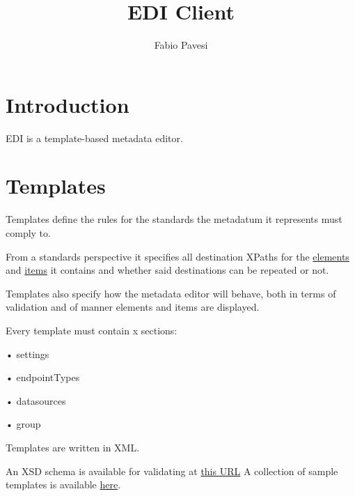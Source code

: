 \documentclass[10pt]{article}
\author{Fabio Pavesi}
\title{EDI Client}
\begin{document}
\maketitle
\newpage
\tableofcontents
\newpage

	\section{Introduction}
		EDI is a template-based metadata editor.
		
	\section{Templates}
	Templates define the rules for the standards the metadatum it represents must comply to.
	
	From a standards perspective it specifies all destination XPaths for the \hyperref[element]{elements} and \hyperref[item]{items} it contains and whether said destinations can be repeated or not.
	
	Templates also specify how the metadata editor will behave, both in terms of validation and of manner elements and items are displayed.
	
	Every template must contain x sections:
	
	• settings
	
	• endpointTypes
	
	• datasources
	
	• group
	
	Templates are written in XML.
	
	An XSD schema is available for validating at  \href{https://github.com/SP7-Ritmare/EDI-NG_client/blob/v3.1/node_launcher/src/templates/edi_template.xsd}{this URL} 	
	A collection of sample templates is available \href{https://github.com/SP7-Ritmare/EDI-NG_client/tree/v3.1/node_launcher/src/templates}{here}.
	
	
	
	
	
	

\newpage
\end{document}
